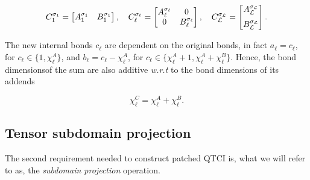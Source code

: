 \begin{equation}
	C_1^{\sigma_1} =
	\begin{bmatrix}
	  A_1^{\sigma_1} & B_1^{\sigma_1} \\
	\end{bmatrix},\quad C_\ell^{\sigma_\ell} =
	\begin{bmatrix}
	  A_\ell^{\sigma_\ell} & 0 \\
	  0 & B_\ell^{\sigma_\ell}
	\end{bmatrix},\quad C_{\mathcal{L}}^{\sigma_{\mathcal{L}}} = \begin{bmatrix}
		A_{\mathcal{L}}^{\sigma_{\mathcal{L}}} \\[6pt]
		B_{\mathcal{L}}^{\sigma_{\mathcal{L}}} 
	  \end{bmatrix}.
	\label{eq:siteTenosorsTTSum}  
\end{equation}

The new internal bonds $c_\ell$ are dependent on the original bonds, in fact $a_\ell = c_\ell$, for $c_\ell \in \{1,\chi^A_\ell\}$, and $b_\ell = c_\ell - \chi^A_\ell$, for $c_\ell \in \{\chi^A_\ell+1,\chi^A_\ell+\chi^B_\ell\}$. Hence, the bond dimensions\footnotemark \;of the sum are also additive \textit{w.r.t} to the bond dimensions of its addends

\begin{equation}
	\chi^C_\ell = \chi^A_\ell + \chi^B_\ell.
\end{equation}


\subsection{Tensor subdomain projection}
The second requirement needed to construct patched QTCI is, what we will refer to as, the \textit{subdomain projection} operation. 

